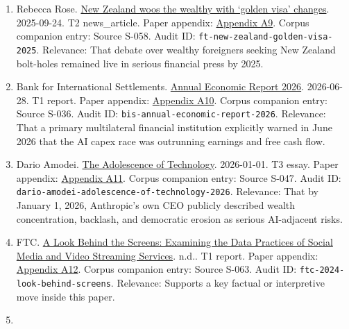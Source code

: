 \documentclass[
  american,
  11pt,
  letterpaper,
]{article}
\begin{document}
\begin{enumerate}
{  A8}. Corpus companion entry: Source S-066. Audit ID:
  \texttt{guardian-billionaires-new-zealand-2018}. Relevance: That by
  February 15, 2018 New Zealand had already become a recognizable
  elite-safe-haven trope in public collapse-prep discourse around
  Silicon Valley.
\item
  Rebecca Rose.
  \href{https://www.ft.com/content/76ca455c-3b16-4413-8738-3f17431d125b}{New
  Zealand woos the wealthy with `golden visa' changes}. 2025-09-24. T2
  news\_article. Paper appendix:
  \hyperref[ch-09-appendix-a9-new-zealand-woos-the-wealthy-with-golden-visa-changes]{Appendix
  A9}. Corpus companion entry: Source S-058. Audit ID:
  \texttt{ft-new-zealand-golden-visa-2025}. Relevance: That debate over
  wealthy foreigners seeking New Zealand bolt-holes remained live in
  serious financial press by 2025.
\item
  Bank for International Settlements.
  \href{https://www.bis.org/publ/arpdf/ar2026e.pdf}{Annual Economic
  Report 2026}. 2026-06-28. T1 report. Paper appendix:
  \hyperref[ch-09-appendix-a10-annual-economic-report-2026]{Appendix
  A10}. Corpus companion entry: Source S-036. Audit ID:
  \texttt{bis-annual-economic-report-2026}. Relevance: That a primary
  multilateral financial institution explicitly warned in June 2026 that
  the AI capex race was outrunning earnings and free cash flow.
\item
  Dario Amodei.
  \href{https://darioamodei.com/essay/the-adolescence-of-technology}{The
  Adolescence of Technology}. 2026-01-01. T3 essay. Paper appendix:
  \hyperref[ch-09-appendix-a11-the-adolescence-of-technology]{Appendix
  A11}. Corpus companion entry: Source S-047. Audit ID:
  \texttt{dario-amodei-adolescence-of-technology-2026}. Relevance: That
  by January 1, 2026, Anthropic's own CEO publicly described wealth
  concentration, backlash, and democratic erosion as serious AI-adjacent
  risks.
\item
  FTC.
  \href{https://www.ftc.gov/reports/look-behind-screens-examining-data-practices-social-media-video-streaming-services}{A
  Look Behind the Screens: Examining the Data Practices of Social Media
  and Video Streaming Services}. n.d.. T1 report. Paper appendix:
  \hyperref[ch-09-appendix-a12-a-look-behind-the-screens-examining-the-data-practices-of-social-media-and-video-streaming-services]{Appendix
  A12}. Corpus companion entry: Source S-063. Audit ID:
  \texttt{ftc-2024-look-behind-screens}. Relevance: Supports a key
  factual or interpretive move inside this paper.
\item

\end{enumerate}
\end{document}
